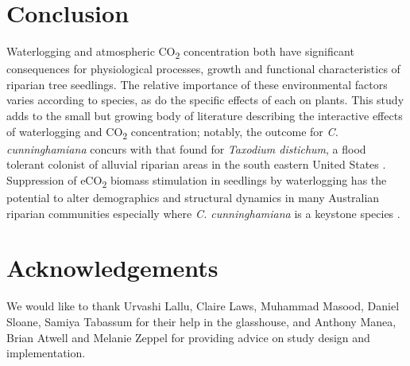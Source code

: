 \documentclass[12pt,a4paper]{memoir}
\begin{document}
\section{Conclusion}
Waterlogging and atmospheric CO\textsubscript{2} concentration both have significant consequences for physiological processes, growth and functional characteristics of riparian tree seedlings. The relative importance of these environmental factors varies according to species, as do the specific effects of each on plants. This study adds to the small but growing body of literature describing the interactive effects of waterlogging and CO\textsubscript{2} concentration; notably, the outcome for \textit{C. cunninghamiana} concurs with that found for \textit{Taxodium distichum}, a flood tolerant colonist of alluvial riparian areas in the south eastern United States \citep{Megonigal2005}. Suppression of eCO\textsubscript{2} biomass stimulation in seedlings by waterlogging has the potential to alter demographics and structural dynamics in many Australian riparian communities especially where \textit{C. cunninghamiana} is a keystone species \citep{Woolfrey2001}.

\section*{Acknowledgements}
We would like to thank Urvashi Lallu, Claire Laws, Muhammad Masood, Daniel Sloane, Samiya Tabassum for their help in the glasshouse, and Anthony Manea, Brian Atwell and Melanie Zeppel for providing advice on study design and implementation.

\renewcommand\bibname{{References}} 
\begin{small}


\end{small}
\end{document}

